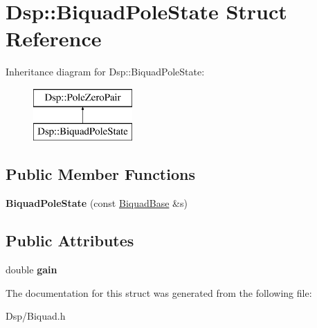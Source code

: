 \hypertarget{structDsp_1_1BiquadPoleState}{\section{Dsp\-:\-:Biquad\-Pole\-State Struct Reference}
\label{structDsp_1_1BiquadPoleState}
}
Inheritance diagram for Dsp\-:\-:Biquad\-Pole\-State\-:\begin{figure}[H]
\begin{center}
\leavevmode
\includegraphics[height=2.000000cm]{structDsp_1_1BiquadPoleState}
\end{center}
\end{figure}
\subsection*{Public Member Functions}
\begin{DoxyCompactItemize}
\item 
\hypertarget{structDsp_1_1BiquadPoleState_a8dfa7a93febc7e94c1f6d2411a5614b2}{{\bfseries Biquad\-Pole\-State} (const \hyperlink{classDsp_1_1BiquadBase}{Biquad\-Base} \&s)}\label{structDsp_1_1BiquadPoleState_a8dfa7a93febc7e94c1f6d2411a5614b2}

\end{DoxyCompactItemize}
\subsection*{Public Attributes}
\begin{DoxyCompactItemize}
\item 
\hypertarget{structDsp_1_1BiquadPoleState_a8e4d8e11369b5885bddc3dd1851488b6}{double {\bfseries gain}}\label{structDsp_1_1BiquadPoleState_a8e4d8e11369b5885bddc3dd1851488b6}

\end{DoxyCompactItemize}


The documentation for this struct was generated from the following file\-:\begin{DoxyCompactItemize}
\item 
Dsp/Biquad.\-h\end{DoxyCompactItemize}
